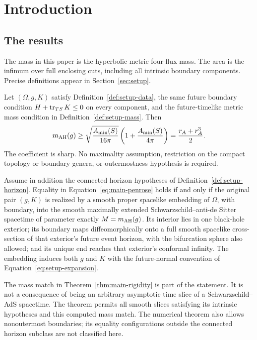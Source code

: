 \section{Introduction}\label{sec:introduction}



\subsection{The results}
The mass in this paper is the hyperbolic metric four-flux mass.
The area is the infimum over full enclosing cuts, including all intrinsic
boundary components. Precise definitions appear in Section~\ref{sec:setup}.

\begin{theorem}\label{thm:main-numerical}
Let $(\Omega,g,K)$ satisfy Definition~\ref{def:setup-data}, the same
future boundary condition $H+\operatorname{tr}_{TS}K\le0$ on every component, and
the future-timelike metric mass condition in Definition~\ref{def:setup-mass}.
Then
\begin{equation}\label{eq:main-penrose}
 m_{\mathrm{AH}}(g)\ge
 \sqrt{\frac{A_{\min}(S)}{16\pi}}
 \left(1+\frac{A_{\min}(S)}{4\pi}\right)
 =\frac{r_A+r_A^3}{2}.
\end{equation}
The coefficient is sharp. No maximality assumption, restriction on the
compact topology or boundary genera, or outermostness hypothesis is required.
\end{theorem}

\begin{theorem}\label{thm:main-rigidity}
Assume in addition the connected horizon hypotheses of
Definition~\ref{def:setup-horizon}. Equality in Equation~\ref{eq:main-penrose}
holds if and only if the original pair $(g,K)$ is realized by a smooth
proper spacelike embedding of $\Omega$, with boundary, into the smooth
maximally extended Schwarzschild--anti-de Sitter spacetime of parameter
exactly $M=m_{\mathrm{AH}}(g)$. Its interior lies in one black-hole exterior;
its boundary maps diffeomorphically onto a full smooth spacelike
cross-section of that exterior's future event horizon, with the
bifurcation sphere also allowed; and its unique end reaches that
exterior's conformal infinity. The embedding induces both $g$ and $K$
with the future-normal convention of Equation~\ref{eq:setup-expansion}.
\end{theorem}

The mass match in Theorem~\ref{thm:main-rigidity} is part of the statement.
It is not a consequence of being an arbitrary asymptotic time slice of
a Schwarzschild--AdS spacetime. The theorem permits all smooth slices
satisfying its intrinsic hypotheses and this computed mass match.
The numerical theorem also allows nonoutermost boundaries; its equality
configurations outside the connected horizon subclass are not classified here.

